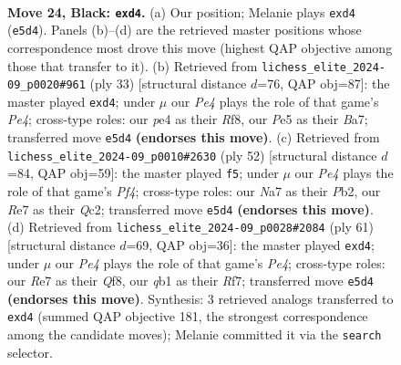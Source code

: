 \documentclass[11pt]{article}
\begin{document}
\clearpage

\begin{figure}[p]\centering
\begin{subfigure}{0.46\textwidth}\centering
\resizebox{\linewidth}{!}{%
\newchessgame
\chessboard[
  setfen={1rq2b2/n1p1r2k/p2p1pp1/3Pp2p/RP1PP3/4RN1P/3B1PP1/1Q3K2 b - - 0 24},
  showmover=false,
  pgfstyle=straightmove, color=movearrow, markmove={e5-d4}
]}
\caption{}
\end{subfigure}\hfill
\begin{subfigure}{0.46\textwidth}\centering
\resizebox{\linewidth}{!}{%
\newchessgame
\chessboard[
  setfen={r4r1k/bpp1npp1/3p1q1p/p2Pp3/P2P4/1PP2N1P/4RPPK/2BQ1R2 b - - 0 17},
  showmover=false,
  pgfstyle=straightmove, color=movearrow, markmove={e5-d4}
]}
\caption{}
\end{subfigure}
\\[4pt]
\begin{subfigure}{0.46\textwidth}\centering
\resizebox{\linewidth}{!}{%
\newchessgame
\chessboard[
  setfen={4r1k1/1pp1r2p/3p1p1q/2nP2p1/p1P1PP2/P2BR1PP/1PQ3K1/4R3 w - - 0 27},
  showmover=false,
  pgfstyle=straightmove, color=movearrow, markmove={f4-f5}
]}
\caption{}
\end{subfigure}\hfill
\begin{subfigure}{0.46\textwidth}\centering
\resizebox{\linewidth}{!}{%
\newchessgame
\chessboard[
  setfen={1r3q1k/2p2r1p/3p1pp1/p1nPp3/3NP2P/1P2P1Q1/P1B2RP1/6K1 b - - 2 31},
  showmover=false,
  pgfstyle=straightmove, color=movearrow, markmove={e5-d4}
]}
\caption{}
\end{subfigure}
\caption{\textbf{Move 24, Black: \texttt{exd4}.} (a) Our position; Melanie plays \texttt{exd4} (\texttt{e5d4}). Panels (b)--(d) are the retrieved master positions whose correspondence most drove this move (highest QAP objective among those that transfer to it). (b) Retrieved from \texttt{lichess\_elite\_2024-09\_p0020\#961} (ply 33) [structural distance $d$=76, QAP obj=87]: the master played \texttt{exd4}; under $\mu$ our \emph{Pe4} plays the role of that game's \emph{Pe4}; cross-type roles: our \emph{p}e4 as their \emph{R}f8, our \emph{P}e5 as their \emph{B}a7; transferred move \texttt{e5d4} \textbf{(endorses this move)}. (c) Retrieved from \texttt{lichess\_elite\_2024-09\_p0010\#2630} (ply 52) [structural distance $d$=84, QAP obj=59]: the master played \texttt{f5}; under $\mu$ our \emph{Pe4} plays the role of that game's \emph{Pf4}; cross-type roles: our \emph{N}a7 as their \emph{P}b2, our \emph{R}e7 as their \emph{Q}c2; transferred move \texttt{e5d4} \textbf{(endorses this move)}. (d) Retrieved from \texttt{lichess\_elite\_2024-09\_p0028\#2084} (ply 61) [structural distance $d$=69, QAP obj=36]: the master played \texttt{exd4}; under $\mu$ our \emph{Pe4} plays the role of that game's \emph{Pe4}; cross-type roles: our \emph{R}e7 as their \emph{Q}f8, our \emph{q}b1 as their \emph{R}f7; transferred move \texttt{e5d4} \textbf{(endorses this move)}. Synthesis: 3 retrieved analogs transferred to \texttt{exd4} (summed QAP objective 181, the strongest correspondence among the candidate moves); Melanie committed it via the \texttt{search} selector.}
\label{fig:thought-m47}
\end{figure}
\end{document}
